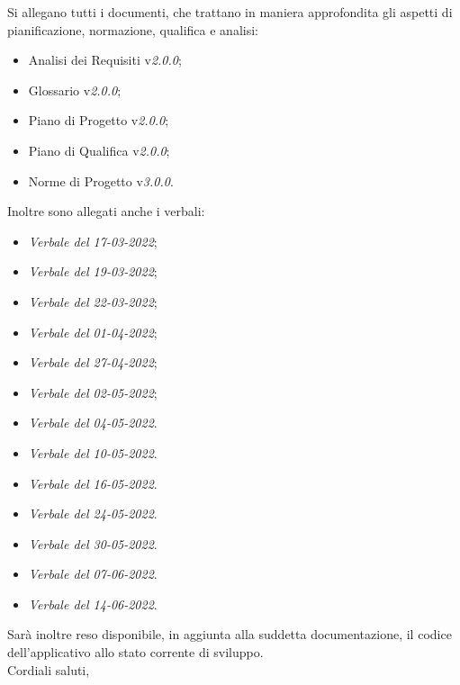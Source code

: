 \documentclass[a4paper, 12pt]{letter}
\begin{document}
\begin{letter}
        Si allegano tutti i documenti, che trattano in maniera approfondita gli aspetti di pianificazione, normazione, qualifica e analisi:
        \begin{itemize}
        	\item Analisi dei Requisiti v\textit{2.0.0};
            \item Glossario v\textit{2.0.0};
            \item Piano di Progetto v\textit{2.0.0};
            \item Piano di Qualifica v\textit{2.0.0};
            \item Norme di Progetto v\textit{3.0.0}.
        \end{itemize}
        Inoltre sono allegati anche i verbali:
        \begin{itemize}
            \item \textit{Verbale del 17-03-2022};
            \item \textit{Verbale del 19-03-2022};
            \item \textit{Verbale del 22-03-2022};
            \item \textit{Verbale del 01-04-2022};
            \item \textit{Verbale del 27-04-2022};
            \item \textit{Verbale del 02-05-2022};
            \item \textit{Verbale del 04-05-2022}.
            \item \textit{Verbale del 10-05-2022}.
            \item \textit{Verbale del 16-05-2022}.
            \item \textit{Verbale del 24-05-2022}.
            \item \textit{Verbale del 30-05-2022}.
            \item \textit{Verbale del 07-06-2022}.
            \item \textit{Verbale del 14-06-2022}.
        \end{itemize}
        Sarà inoltre reso disponibile, in aggiunta alla suddetta documentazione, il codice dell'applicativo allo stato corrente di sviluppo. \\
        Cordiali saluti,
        \begin{flushright}

\end{flushright}
\end{letter}
\end{document}
